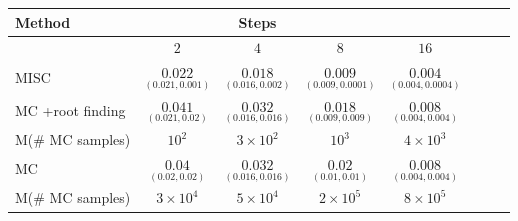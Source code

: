\FloatBarrier
\begin{table}[h!]
	\centering
	\begin{tabular}{l*{6}{c}r}
		\toprule[1.5pt]
	Method & & Steps  & &     \\
	\hline
           & $2$ & $4$ & $8$ & $16$  \\
		\hline
		MISC &  $\underset{(0.021,0.001)}{\mathbf{0.022}}$ & $\underset{(0.016,0.002)}{\mathbf{0.018}}$ & $\underset{(0.009,0.0001)}{\mathbf{0.009}}$ & $\underset{(0.004,0.0004)}{\mathbf{0.004}}$  \\
		
		\hline
			MC +root finding  &  $\underset{(0.021,0.02)}{\mathbf{0.041}}$ & $\underset{(0.016,0.016)}{\mathbf{0.032}}$ & $\underset{(0.009,0.009)}{\mathbf{0.018}}$ & $\underset{(0.004,0.004)}{\mathbf{0.008}}$  \\
			M(\# MC samples)   & $10^2 $  & $3 \times 10^2 $  & $
			10^3$ & $4 \times 10^3$ \\	
		\hline	
				MC   &  $\underset{(0.02,0.02)}{\mathbf{0.04}}$ & $\underset{(0.016,0.016)}{\mathbf{0.032}}$ & $\underset{(0.01,0.01)}{\mathbf{}0.02}$ & $\underset{(0.004,0.004)}{\mathbf{0.008}}$  \\	
				M(\# MC samples)   & $3 \times 10^4$  & $5\times 10^4$  & $2\times 10^5$ & $8\times 10^5$ \\	
		

\end{tabular}
\end{table}
